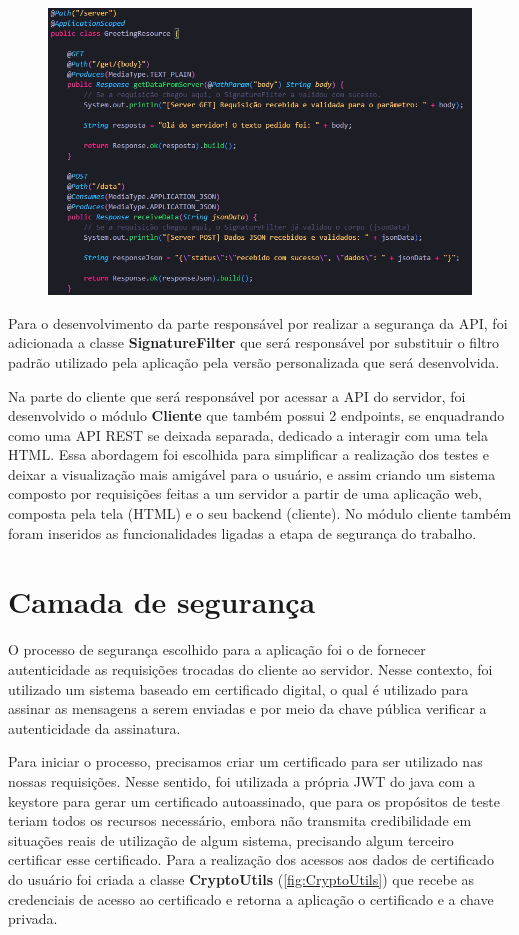 \documentclass[12pt]{article}
\begin{document}
\begin{figure}[h]
    \centering
    \includegraphics[width = 0.8\linewidth]{Imagens/Endpoints.png}  
    \label{fig:Endpoints}
\end{figure}

Para o desenvolvimento da parte responsável por realizar a segurança da API, foi adicionada a classe \textbf{SignatureFilter} que será responsável por substituir o filtro padrão utilizado pela aplicação pela versão personalizada que será desenvolvida.

Na parte do cliente que será responsável por acessar a API do servidor, foi desenvolvido o módulo \textbf{Cliente} que também possui 2 endpoints, se enquadrando como uma API REST se deixada separada, dedicado a interagir com uma tela HTML. Essa abordagem foi escolhida para simplificar a realização dos testes e deixar a visualização mais amigável para o usuário, e assim criando um sistema composto por requisições feitas a um servidor a partir de uma aplicação web, composta pela tela (HTML) e o seu backend (cliente). No módulo cliente também foram inseridos as funcionalidades ligadas a etapa de segurança do trabalho. 

\section{Camada de segurança}
O processo de segurança escolhido para a aplicação foi o de fornecer autenticidade as requisições trocadas do cliente ao servidor. Nesse contexto, foi utilizado um sistema baseado em certificado digital, o qual é utilizado para assinar as mensagens a serem enviadas e por meio da chave pública verificar a autenticidade da assinatura. 

Para iniciar o processo, precisamos criar um certificado para ser utilizado nas nossas requisições. Nesse sentido, foi utilizada a própria JWT do java com a keystore para gerar um certificado autoassinado, que para os propósitos de teste teriam todos os recursos necessário, embora não transmita credibilidade em situações reais de utilização de algum sistema, precisando algum terceiro certificar esse certificado. Para a realização dos acessos aos dados de certificado do usuário foi criada a classe \textbf{CryptoUtils} (\ref{fig:CryptoUtils}) que recebe as credenciais de acesso ao certificado e retorna a aplicação o certificado e a chave privada. 
\end{document}
